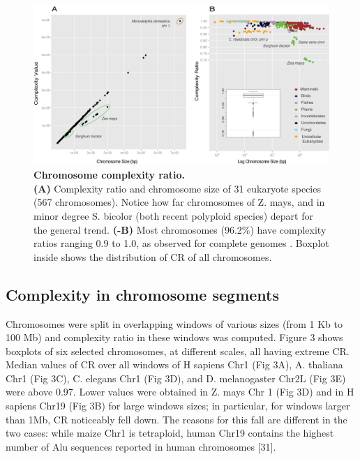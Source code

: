 \begin{figure}[htpb] 
\centering 
\includegraphics[width=\textwidth]{tex_source/figures/dna_struct/chromosome_complexity.png}
\caption[Chromosome complexity ratio]{{\bf Chromosome complexity ratio.} \\\textbf{(A)} Complexity ratio and chromosome size of 31 eukaryote species (567 chromosomes). Notice how far chromosomes of Z. mays, and in minor degree S. bicolor (both recent polyploid species) depart for the general trend. \textbf{(-B)} Most chromosomes (96.2\%) have complexity ratios ranging 0.9 to 1.0, as observed for complete genomes . Boxplot inside shows the distribution of CR of all
chromosomes.}
\label{fig:chr_compl}
\end{figure}

\subsection{Complexity in chromosome segments}
\label{sec:compl-chrom-segm}

Chromosomes were split in overlapping windows of various sizes (from 1 Kb to 100 Mb) and complexity ratio in these windows was computed. Figure 3 shows boxplots of six selected chromosomes, at different scales, all having extreme CR. Median values of CR over all windows of H sapiens Chr1 (Fig 3A), A. thaliana Chr1 (Fig 3C), C. elegans Chr1 (Fig 3D), and D. melanogaster Chr2L (Fig 3E) were above 0.97. Lower values were obtained in Z. mays Chr 1 (Fig 3D) and in H sapiens Chr19 (Fig 3B) for large windows sizes; in particular, for windows larger than 1Mb, CR noticeably fell down. The reasons for this fall are different in the two cases: while maize Chr1 is tetraploid, human Chr19 contains the highest number of
Alu sequences reported in human chromosomes [31].

